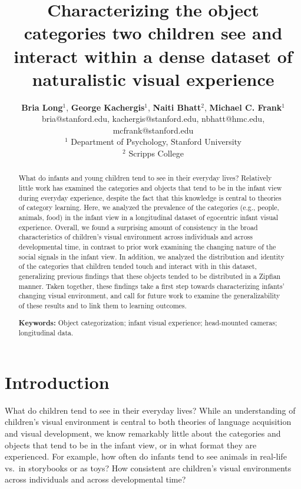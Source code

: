 \documentclass[10pt, letterpaper]{article}
\title{Characterizing the object categories two children see and interact
within a dense dataset of naturalistic visual experience}
\author{{\bf Bria Long}$^{1}$, {\bf George Kachergis}$^{1}$, {\bf Naiti Bhatt}$^{2}$, {\bf Michael C. Frank}$^{1}$ \\ 
     bria@stanford.edu, kachergis@stanford.edu, nbhatt@hmc.edu, mcfrank@stanford.edu \\
     $^{1}$ Department of Psychology, Stanford University \\
     $^{2}$ Scripps College
     }
\begin{document}
\maketitle

\begin{abstract}
What do infants and young children tend to see in their everyday lives?
Relatively little work has examined the categories and objects that tend
to be in the infant view during everyday experience, despite the fact
that this knowledge is central to theories of category learning. Here,
we analyzed the prevalence of the categories (e.g., people, animals,
food) in the infant view in a longitudinal dataset of egocentric infant
visual experience. Overall, we found a surprising amount of consistency
in the broad characteristics of children's visual environment across
individuals and across developmental time, in contrast to prior work
examining the changing nature of the social signals in the infant view.
In addition, we analyzed the distribution and identity of the categories
that children tended touch and interact with in this dataset,
generalizing previous findings that these objects tended to be
distributed in a Zipfian manner. Taken together, these findings take a
first step towards characterizing infants' changing visual environment,
and call for future work to examine the generalizability of these
results and to link them to learning outcomes.

\textbf{Keywords:}
Object categorization; infant visual experience; head-mounted cameras;
longitudinal data.
\end{abstract}

\hypertarget{introduction}{%
\section{Introduction}\label{introduction}}

What do children tend to see in their everyday lives? While an
understanding of children's visual environment is central to both
theories of language acquisition and visual development, we know
remarkably little about the categories and objects that tend to be in
the infant view, or in what format they are experienced. For example,
how often do infants tend to see animals in real-life vs.~in storybooks
or as toys? How consistent are children's visual environments across
individuals and across developmental time?
\end{document}
